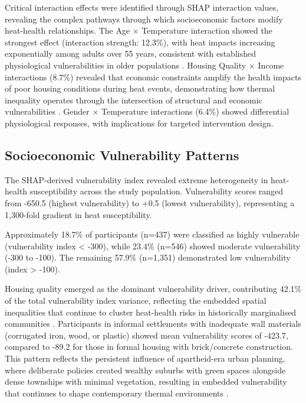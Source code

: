 \documentclass[11pt,a4paper]{article}
\begin{document}
Critical interaction effects were identified through SHAP interaction values, revealing the complex pathways through which socioeconomic factors modify heat-health relationships. The Age × Temperature interaction showed the strongest effect (interaction strength: 12.3\%), with heat impacts increasing exponentially among adults over 55 years, consistent with established physiological vulnerabilities in older populations \cite{meade2024effects}. Housing Quality × Income interactions (8.7\%) revealed that economic constraints amplify the health impacts of poor housing conditions during heat events, demonstrating how thermal inequality operates through the intersection of structural and economic vulnerabilities \cite{mitchell2018thermal}. Gender × Temperature interactions (6.4\%) showed differential physiological responses, with implications for targeted intervention design.

\subsection{Socioeconomic Vulnerability Patterns}

The SHAP-derived vulnerability index revealed extreme heterogeneity in heat-health susceptibility across the study population. Vulnerability scores ranged from -650.5 (highest vulnerability) to +0.5 (lowest vulnerability), representing a 1,300-fold gradient in heat susceptibility.

Approximately 18.7\% of participants (n=437) were classified as highly vulnerable (vulnerability index < -300), while 23.4\% (n=546) showed moderate vulnerability (-300 to -100). The remaining 57.9\% (n=1,351) demonstrated low vulnerability (index > -100).

Housing quality emerged as the dominant vulnerability driver, contributing 42.1\% of the total vulnerability index variance, reflecting the embedded spatial inequalities that continue to cluster heat-health risks in historically marginalised communities \cite{strauss2019historical}. Participants in informal settlements with inadequate wall materials (corrugated iron, wood, or plastic) showed mean vulnerability scores of -423.7, compared to -89.2 for those in formal housing with brick/concrete construction. This pattern reflects the persistent influence of apartheid-era urban planning, where deliberate policies created wealthy suburbs with green spaces alongside dense townships with minimal vegetation, resulting in embedded vulnerability that continues to shape contemporary thermal environments \cite{burbidge2022apartheid}.
\end{document}
